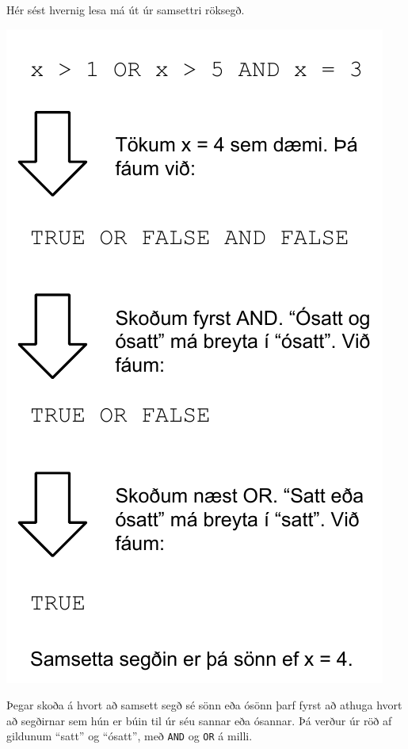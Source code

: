 \begin{marginfigure}
\caption[Samsett röksegð]{Hér sést hvernig lesa má út úr samsettri röksegð.}
\label{mynd:samsett-segd}
\centering
\includegraphics[width=\linewidth]{myndir/samsett-segd}
\end{marginfigure}

Þegar skoða á hvort að samsett segð sé sönn eða ósönn þarf fyrst að athuga hvort að segðirnar sem hún er búin til úr séu sannar eða ósannar. Þá verður úr röð af gildunum ``satt'' og ``ósatt'', með \verb|AND| og \verb|OR| á milli. 

